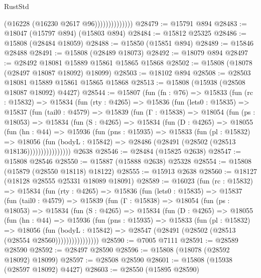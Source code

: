 \begin{lexlean}{RustStd}
\begin{coremodule}
                            (@16228 (@16230 @2617 @96))))))))))))))
@28479 := @15791 @894
@28483 := @18047 (@15797 @894) (@15803 @894)
@28484 := @15812 @25325
@28486 := @15808 (@28484 @18059)
@28488 := @15850 (@15851 @894)
@28489 := @15846 @28488
@28491 := @15808 (@28489 @18073)
@28492 := @18079 @894
@28497 := @28492 @18081 @15889 @15861 @15865 @15868
@28502 := @15808 (@18078 (@28497 @18087 @18092) @18099)
@28503 := @18102 @894
@28508 := @28503 @18081 @15889 @15861 @15865 @15868
@28513 := @15808 (@15938 (@28508 @18087 @18092) @4427)
@28544 := @15807
    (fun (fn : @76) =>
    @15833
      (fun (rc : @15832) =>
      @15834
        (fun (rty : @4265) =>
        @15836
          (fun (lets0 : @15835) =>
          @15837
            (fun (tail0 : @4579) =>
            @15839
              (fun (Γ : @15838) =>
              @18054
                (fun (ps : @18053) =>
                @15834
                  (fun (S : @4265) =>
                  @15834
                    (fun (D : @4265) =>
                    @18055
                      (fun (hn : @44) =>
                      @15936
                        (fun (pns : @15935) =>
                        @15833
                          (fun (pl : @15832) =>
                          @18056
                            (fun (bodyL : @15842) =>
                            @28486 (@28491 (@28502 (@28513 @18136))))))))))))))))
    @2638
@28546 := @28484 (@15825 @2638)
@28547 := @15808 @28546
@28550 := @15887 (@15888 @2638) @25328
@28554 := @15808 (@15879 (@28550 @18118) @18122)
@28555 := @15913 @2638
@28560 := @18127 (@18128 @28555 @25331 @18089 @18091)
@28589 := @16023
    (fun (rc : @15832) =>
    @15834
      (fun (rty : @4265) =>
      @15836
        (fun (lets0 : @15835) =>
        @15837
          (fun (tail0 : @4579) =>
          @15839
            (fun (Γ : @15838) =>
            @18054
              (fun (ps : @18053) =>
              @15834
                (fun (S : @4265) =>
                @15834
                  (fun (D : @4265) =>
                  @18055
                    (fun (hn : @44) =>
                    @15936
                      (fun (pns : @15935) =>
                      @15833
                        (fun (pl : @15832) =>
                        @18056
                          (fun (bodyL : @15842) =>
                          @28547 (@28491 (@28502 (@28513 (@28554 @28560))))))))))))))))
@28590 := @7005 @7111
@28591 := @28589 @28590
@28592 := @28497 @28590
@28596 := @15808 (@18078 (@28592 @18092) @18099)
@28597 := @28508 @28590
@28601 := @15808 (@15938 (@28597 @18092) @4427)
@28603 := @28550 (@15895 @28590)

\end{coremodule}
\end{lexlean}
